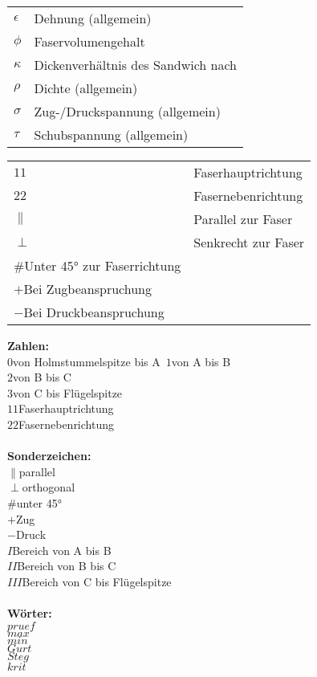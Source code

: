 \begin{table}
	\begin{tabular}{ll}
		$ \epsilon $&Dehnung (allgemein)\\
		$ \phi $&Faservolumengehalt\\
		$ \kappa $&Dickenverhältnis des Sandwich nach \cite{item1}\\
		$ \rho $&Dichte (allgemein)\\
		$ \sigma $&Zug-/Druckspannung (allgemein)\\
		$ \tau $&Schubspannung (allgemein)\\
	\end{tabular}
\end{table}

\begin{table}
	\begin{tabular}{ll}
		$ 11 $&Faserhauptrichtung\\
		$ 22 $&Fasernebenrichtung\\
		$ \parallel $&Parallel zur Faser\\
		$ \perp $&Senkrecht zur Faser\\
		$ \# $Unter 45° zur Faserrichtung\\
		$ + $Bei Zugbeanspruchung\\
		$ - $Bei Druckbeanspruchung\\
		 
	\end{tabular}
\end{table}


\noindent\textbf{Zahlen:}\\
$0$\quad\quad von Holmstummelspitze bis A\
$1$\quad\quad von A bis B\\
$2$\quad\quad von B bis C\\
$3$\quad\quad von C bis Flügelspitze\\
$11$\quad\quad Faserhauptrichtung\\
$22$\quad\quad Fasernebenrichtung\\
\\
\noindent\textbf{Sonderzeichen:}\\
$\parallel$\quad\quad parallel\\
$\perp$\quad\quad orthogonal\\
$\#$\quad\quad unter 45°\\
$+$\quad\quad Zug\\
$-$\quad\quad Druck\\
$I$\quad\quad Bereich von A bis B\\
$II$\quad\quad Bereich von B bis C\\
$III$\quad\quad Bereich von C bis Flügelspitze\\
\\
\noindent\textbf{Wörter:}\\
$pruef$\quad\\
$max$\quad\\
$min$\quad\\
$Gurt$\quad\\
$Steg$\quad\\
$krit$\quad\\